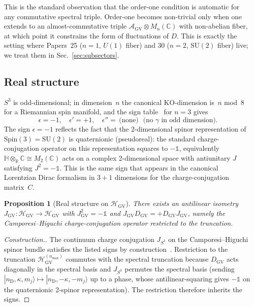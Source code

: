 \documentclass[11pt]{article}
\newtheorem{proposition}{Proposition}
\begin{document}
This is the standard observation that the order-one condition is
automatic for any commutative spectral triple.  Order-one becomes
non-trivial only when one extends to an almost-commutative triple
$\mathcal{A}_{\mathrm{GV}} \otimes M_n(\mathbb{C})$ with non-abelian
fiber, at which point it constrains the form of fluctuations of $D$.
This is exactly the setting where Papers~25 ($n=1$, $U(1)$ fiber) and
30 ($n=2$, $\mathrm{SU}(2)$ fiber) live; we treat them in
Sec.~\ref{sec:subsectors}.

\subsection{Real structure}

$S^3$ is odd-dimensional; in dimension~$n$ the canonical
$\mathrm{KO}$-dimension is~$n$ mod~$8$ for a Riemannian spin manifold,
and the sign table~\cite{connes1995,vansuijlekom_book2015} for $n=3$
gives
\[
   \epsilon = -1, \quad \epsilon' = +1, \quad \epsilon'' = ~\text{(none)}~
   ~~\text{(no $\gamma$ in odd dimension).}
\]
The sign $\epsilon = -1$ reflects the fact that the 2-dimensional
spinor representation of $\mathrm{Spin}(3) = \mathrm{SU}(2)$ is
quaternionic (pseudoreal): the standard charge-conjugation operator
on this representation squares to $-\mathbb{1}$, equivalently
$\mathbb{H} \otimes_{\mathbb{R}} \mathbb{C} \cong M_2(\mathbb{C})$
acts on a complex 2-dimensional space with antiunitary $J$ satisfying
$J^2 = -\mathbb{1}$.  This is the same sign that appears in the
canonical Lorentzian Dirac formalism in $3+1$ dimensions for the
charge-conjugation matrix~$C$.

\begin{proposition}[Real structure on $\mathcal{H}_{\mathrm{GV}}$]
\label{prop:reality}
There exists an antilinear isometry $J_{\mathrm{GV}}:
\mathcal{H}_{\mathrm{GV}} \to \mathcal{H}_{\mathrm{GV}}$ with
$J_{\mathrm{GV}}^2 = -\mathbb{1}$ and $J_{\mathrm{GV}} D_{\mathrm{GV}}
= +D_{\mathrm{GV}} J_{\mathrm{GV}}$, namely the Camporesi--Higuchi
charge-conjugation operator restricted to the truncation.
\end{proposition}

\begin{proof}[Construction.]
The continuum charge conjugation $J_{S^3}$ on the
Camporesi--Higuchi spinor bundle satisfies the listed signs by
construction~\cite{camporesi_higuchi1996,connes1995}.  Restriction to
the truncation $\mathcal{H}_{\mathrm{GV}}^{(n_{\max})}$ commutes with
the spectral truncation because $D_{\mathrm{GV}}$ acts diagonally in
the spectral basis and $J_{S^3}$ permutes the spectral basis (sending
$|n_{\mathrm{D}}, \kappa, m_j\rangle \mapsto
|n_{\mathrm{D}}, -\kappa, -m_j\rangle$ up to a phase, whose
antilinear-squaring gives $-\mathbb{1}$ on the quaternionic 2-spinor
representation).  The restriction therefore inherits the signs.
\end{proof}
\end{document}

